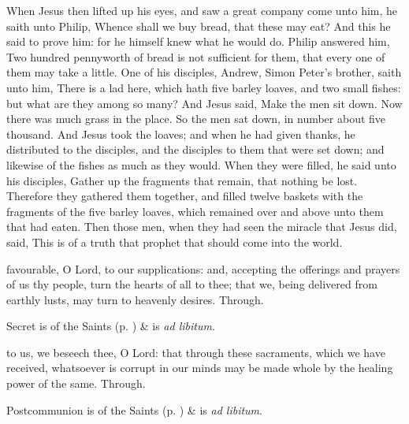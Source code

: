  When Jesus then lifted up his eyes, and saw a great company come unto him, he saith unto Philip, Whence shall we buy bread, that these may eat? And this he said to prove him: for he himself knew what he would do. Philip answered him, Two hundred pennyworth of bread is not sufficient for them, that every one of them may take a little. One of his disciples, Andrew, Simon Peter's brother, saith unto him, There is a lad here, which hath five barley loaves, and two small fishes: but what are they among so many? And Jesus said, Make the men sit down. Now there was much grass in the place. So the men sat down, in number about five thousand. And Jesus took the loaves; and when he had given thanks, he distributed to the disciples, and the disciples to them that were set down; and likewise of the fishes as much as they would. When they were filled, he said unto his disciples, Gather up the fragments that remain, that nothing be lost. Therefore they gathered them together, and filled twelve baskets with the fragments of the five barley loaves, which remained over and above unto them that had eaten. Then those men, when they had seen the miracle that Jesus did, said, This is of a truth that prophet that should come into the world.


\secret
{} favourable, O Lord, to our supplications: and, accepting the offerings and prayers of us thy people, turn the hearts of all to thee; that we, being delivered from earthly lusts, may turn to heavenly desires. Through.

\begin{rubric}
     Secret is of the Saints (p. \pageref{SPSaints}) \&  is \emph{ad libitum}.
\end{rubric}



 to us, we beseech thee, O Lord: that through these sacraments, which we have received, whatsoever is corrupt in our minds may be made whole by the healing power of the same. Through.

\begin{rubric}
     Postcommunion is of the Saints (p. \pageref{SPSaints}) \&  is \emph{ad libitum}.
\end{rubric}